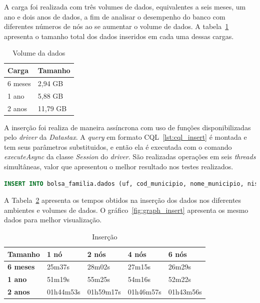 A carga foi realizada com três volumes de dados, equivalentes a seis meses, um ano e dois anos de dados, a fim de analisar o desempenho do banco com diferentes números de nós ao se aumentar o volume de dados. A tabela~\ref{tab:volume} apresenta o tamanho total dos dados inseridos em cada uma dessas cargas.

\begin{table}[]
	\centering
	\caption{Volume da dados}
	\label{tab:volume}
	\begin{tabular}{ll}
		\textbf{Carga} & \textbf{Tamanho} \\ \hline
		6 meses        &  2,94 GB             \\ \hline
		1 ano          &  5,88 GB             \\ \hline
		2 anos         &  11,79 GB             \\ \hline
	\end{tabular}
\end{table}

A inserção foi realiza de maneira assíncrona com uso de funções disponibilizadas pelo \emph{driver} da \emph{Datastax}. A \emph{query} em formato CQL~\ref{lst:cql_insert} é montada e tem seus parâmetros substituidos, e então ela é executada com o comando \emph{executeAsync} da classe \emph{Session} do \emph{driver}. São realizadas operações em seis \emph{threads} simultâneas, valor que apresentou o melhor resultado nos testes realizados.

\begin{lstlisting}[caption={Código CQL para inserção},label={lst:cql_insert},language=SQL]
INSERT INTO bolsa_familia.dados (uf, cod_municipio, nome_municipio, nis_favorecido, nome_favorecido, fonte, valor, periodo) VALUES (?, ?, ?, ?, ?, ?, ?, ?)
\end{lstlisting}

A Tabela~\ref{tb_insert} apresenta os tempos obtidos na inserção dos dados nos diferentes ambientes e volumes de dados. O gráfico~\ref{fig:graph_insert} apresenta os mesmo dados para melhor visualização.


\begin{table}[]
	\centering
	\caption{Inserção}
	\label{tb_insert}
	\begin{tabular}{lllll}
		\textbf{Tamanho}	& \textbf{1 nó} & \textbf{2 nós} & \textbf{4 nós} & \textbf{6 nós} \\ \hline
		\textbf{6 meses}    & 25m37s        & 28m02s         & 27m15s         & 26m29s         \\ \hline
		\textbf{1 ano}      & 51m19s        & 55m25s         & 54m16s         & 52m22s         \\ \hline
		\textbf{2 anos}     & 01h44m53s     & 01h59m17s      & 01h46m57s      & 01h43m56s      \\ \hline
	\end{tabular}
\end{table}

